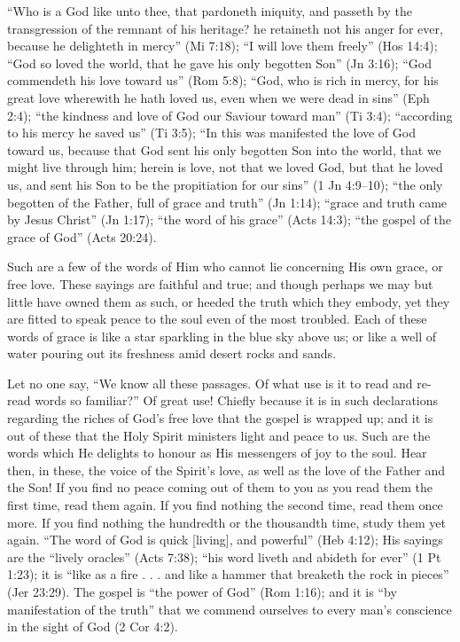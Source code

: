\documentclass[
]{book}
\begin{document}
``Who is a God like unto thee, that pardoneth iniquity, and passeth by the transgression of the remnant of his heritage? he retaineth not his anger for ever, because he delighteth in mercy'' (Mi 7:18); ``I will love them freely'' (Hos 14:4); ``God so loved the world, that he gave his only begotten Son'' (Jn 3:16); ``God commendeth his love toward us'' (Rom 5:8); ``God, who is rich in mercy, for his great love wherewith he hath loved us, even when we were dead in sins'' (Eph 2:4); ``the kindness and love of God our Saviour toward man'' (Ti 3:4); ``according to his mercy he saved us'' (Ti 3:5); ``In this was manifested the love of God toward us, because that God sent his only begotten Son into the world, that we might live through him; herein is love, not that we loved God, but that he loved us, and sent his Son to be the propitiation for our sins'' (1 Jn 4:9--10); ``the only begotten of the Father, full of grace and truth'' (Jn 1:14); ``grace and truth came by Jesus Christ'' (Jn 1:17); ``the word of his grace'' (Acts 14:3); ``the gospel of the grace of God'' (Acts 20:24).

Such are a few of the words of Him who cannot lie concerning His own grace, or free love. These sayings are faithful and true; and though perhaps we may but little have owned them as such, or heeded the truth which they embody, yet they are fitted to speak peace to the soul even of the most troubled. Each of these words of grace is like a star sparkling in the blue sky above us; or like a well of water pouring out its freshness amid desert rocks and sands.

Let no one say, ``We know all these passages. Of what use is it to read and re-read words so familiar?'' Of great use! Chiefly because it is in such declarations regarding the riches of God's free love that the gospel is wrapped up; and it is out of these that the Holy Spirit ministers light and peace to us. Such are the words which He delights to honour as His messengers of joy to the soul. Hear then, in these, the voice of the Spirit's love, as well as the love of the Father and the Son! If you find no peace coming out of them to you as you read them the first time, read them again. If you find nothing the second time, read them once more. If you find nothing the hundredth or the thousandth time, study them yet again. ``The word of God is quick {[}living{]}, and powerful'' (Heb 4:12); His sayings are the ``lively oracles'' (Acts 7:38); ``his word liveth and abideth for ever'' (1 Pt 1:23); it is ``like as a fire . . . and like a hammer that breaketh the rock in pieces'' (Jer 23:29). The gospel is ``the power of God'' (Rom 1:16); and it is ``by manifestation of the truth'' that we commend ourselves to every man's conscience in the sight of God (2 Cor 4:2).
\end{document}
